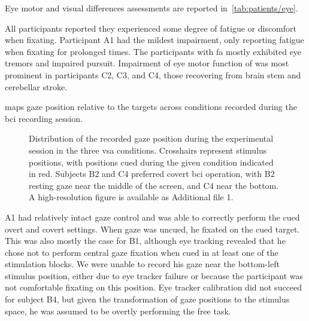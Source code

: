 \documentclass{article}
\newcommand{\skill}{{\color{gdvGreen}{$\pmb{+}$}}}
\newcommand{\noskill}{{\color{gdvOrange}{$\pmb{-}$}}}
\newcommand{\snoskill}{{\color{gdvRed}{$\pmb{/}$}}}
\begin{document}
Eye motor and visual differences assessments are reported
in~\cref{tab:patients/eye}.
\begin{table}
	
	\caption[Vision and eye motor assessments of the included participants.]{%
		Vision and eye motor assessment as defined by \textcite{FriedOken2020} of
		participants included in this study.
		\skill\ no impairment, \noskill\ minor impairment, \snoskill\ major impairment.
		Visual acuity was assessed using the logMAR scale (0.0: normal vision,
		0.05-0.5: minor visualimpairment, 0.5-1.3: major visual impairment, > 1.3 blindness~\cite{WHO2019}).
	}%
	\label{tab:patients/eye}
\end{table}
All participants reported they experienced some degree of fatigue or discomfort
when fixating.
Participant A1 had the mildest impairment, only reporting fatigue when fixating
for prolonged times.
The participants with \ac{fa} mostly exhibited eye tremors and impaired pursuit.
Impairment of eye motor function of was most prominent in participants
C2, C3, and C4, those recovering from brain stem and cerebellar stroke.

 maps gaze position relative to the targets
across conditions recorded during the \ac{bci} recording session.
\begin{figure}
	\caption{%
		Distribution of the recorded gaze position during the experimental session in the three \ac{vsa}
		conditions.
		Crosshairs represent stimulus positions, with positions cued during
		the given condition indicated in red.
		Subjects B2 and C4 preferred covert \ac{bci} operation, with B2 resting gaze
		near the middle of the screen, and C4 near the bottom.
		A high-resolution figure is available as Additional file 1.
	}%
	\label{fig:patients/gaze}
\end{figure}
A1 had relatively intact gaze control and was able to correctly perform the
cued overt and covert settings.
When gaze was uncued, he fixated on the cued target.
This was also mostly the case for B1, although eye tracking revealed that he
chose not to perform central gaze fixation when cued in at least one of the
stimulation blocks. We were unable to record his gaze near the bottom-left
stimulus position, either due to eye tracker failure or because the participant
was not comfortable fixating on this position.
Eye tracker calibration did not succeed for subject B4, but given the
transformation of gaze positions to the stimulus space, he was assumed to
be overtly performing the free task.
\end{document}
